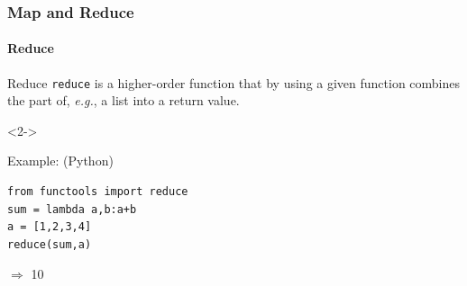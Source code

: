 \documentclass[aspectratio=169,dvipsnames]{beamer}
\begin{document}
    \begin{frame}[fragile]
        \frametitle{Map and Reduce}
        \framesubtitle{Reduce}

            \begin{block}{Reduce}
                \texttt{reduce} is a higher-order function that by using a
                given function combines the part of, \textit{e.g.}, a list into
                a return value.
            \end{block}
            \begin{uncoverenv}<2->
            \begin{block}{Example: \hfill \small(Python)}
            \begin{center}
            \begin{minipage}{0.8\linewidth}
            \begin{lstlisting}
from functools import reduce
sum = lambda a,b:a+b
a = [1,2,3,4]
reduce(sum,a)
            \end{lstlisting}
            $\Rightarrow$ 10
            \end{minipage}
            \end{center}
            \end{block}
            \end{uncoverenv}
    \end{frame}
\end{document}
